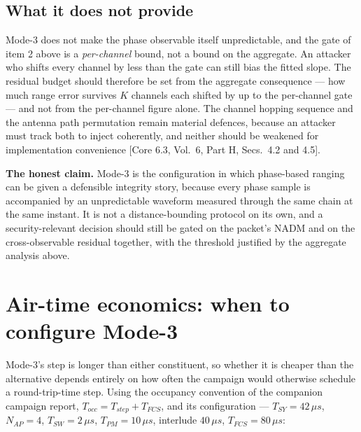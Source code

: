 \documentclass[11pt,a4paper]{article}
\newcommand{\us}{\,\ensuremath{\upmu}s}
\newcommand{\NADM}{\mathrm{NADM}}
\newcommand{\Tsy}{T_{SY}}
\newcommand{\Tsw}{T_{SW}}
\newcommand{\Tpm}{T_{PM}}
\newcommand{\Nap}{N_{AP}}
\providecommand{\upmu}{\mu}
\newcommand{\core}[1]{\textcolor{rulegrey}{\small[Core 6.3, #1]}}
\begin{document}
\subsection{What it does not provide}

Mode-3 does not make the phase observable itself unpredictable, and the gate of item 2 above is a
\emph{per-channel} bound, not a bound on the aggregate. An attacker who shifts every channel by less
than the gate can still bias the fitted slope. The residual budget should therefore be set from the
aggregate consequence --- how much range error survives $K$ channels each shifted by up to the
per-channel gate --- and not from the per-channel figure alone. The channel hopping sequence and the
antenna path permutation remain material defences, because an attacker must track both to inject
coherently, and neither should be weakened for implementation convenience
\core{Vol.\ 6, Part H, Secs.\ 4.2 and 4.5}.

\begin{callout}
\textbf{The honest claim.} Mode-3 is the configuration in which phase-based ranging can be given a
defensible integrity story, because every phase sample is accompanied by an unpredictable waveform
measured through the same chain at the same instant. It is not a distance-bounding protocol on its
own, and a security-relevant decision should still be gated on the packet's $\NADM$ and on the
cross-observable residual together, with the threshold justified by the aggregate analysis above.
\end{callout}

\section{Air-time economics: when to configure Mode-3}
\label{sec:economics}

Mode-3's step is longer than either constituent, so whether it is cheaper than the alternative
depends entirely on how often the campaign would otherwise schedule a round-trip-time step. Using the
occupancy convention of the companion campaign report, $T_{occ} = T_{step} + T_{FCS}$, and its
configuration --- $\Tsy=42\us$, $\Nap=4$, $\Tsw=2\us$, $\Tpm=10\us$, interlude $40\us$,
$T_{FCS}=80\us$:
\end{document}
